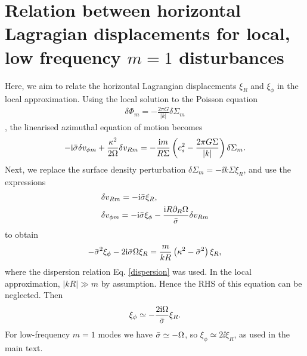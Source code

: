 \section{Relation between horizontal Lagragian displacements for
  local, low frequency $m=1$ disturbances}\label{horizontal_displacements}
Here, we aim to relate the horizontal Lagrangian displacements $\xi_R$
and $\xi_\phi$ in the local approximation. Using the local solution to
the Poisson equation 
\begin{align}
  \delta \Phi_m = -\frac{2\pi G}{|k|} \delta\Sigma_m 
\end{align}
\citep{shu91}, the linearised azimuthal equation of motion becomes 
\begin{align} 
  - \mathrm{i}\bar{\sigma} \delta v_{\phi m}  + \frac{\kappa^2}{2\Omega}\delta v_{Rm} = -\frac{\mathrm{i}
    m}{R\Sigma}\left(c_s^2 - \frac{2\pi G
      \Sigma}{|k|}\right)\delta\Sigma_m. 
\end{align}
Next, we replace the surface density perturbation
$\delta \Sigma_m = -\ii k \Sigma \xi_R$, and use the expressions
\begin{align}
  &\delta v_{Rm} = -\mathrm{i}\bar{\sigma}\xi_R,\\
  &\delta v_{\phi m} = -\mathrm{i}\bar{\sigma}\xi_\phi - \frac{\mathrm{i} R
    \partial_R\Omega}{\bar{\sigma}} \delta v_{Rm}
\end{align}
\citep{papaloizou85} to obtain 
\begin{align}
  -\bar{\sigma}^2\xi_\phi - 2\mathrm{i}\bar{\sigma}\Omega \xi_R =
  \frac{m}{kR}\left(\kappa^2 - \bar{\sigma}^2\right)\xi_R, 
\end{align}
where the dispersion relation Eq. \ref{dispersion} was used. 
In the local approximation, $|kR|\gg m$ by assumption.%
 Hence the RHS of this equation can be neglected. Then 
\begin{align}
  \xi_\phi \simeq -\frac{2\mathrm{i}\Omega}{\bar{\sigma}}\xi_R.
\end{align}
For low-frequency $m=1$ modes we have $\bar{\sigma} \simeq -\Omega$, so
$\xi_\phi\simeq 2\ii\xi_R$, as used in the main text.  